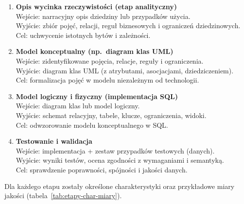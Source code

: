 \begin{enumerate}
  \item \textbf{Opis wycinka rzeczywistości (etap analityczny)} \\
  Wejście: narracyjny opis dziedziny lub przypadków użycia. \\
  Wyjście: zbiór pojęć, relacji, reguł biznesowych i ograniczeń dziedzinowych. \\
  Cel: uchwycenie istotnych bytów i zależności.
  \item \textbf{Model konceptualny (np.\ diagram klas UML)} \\
  Wejście: zidentyfikowane pojęcia, relacje, reguły i ograniczenia. \\
  Wyjście: diagram klas UML (z atrybutami, asocjacjami, dziedziczeniem). \\
  Cel: formalizacja pojęć w modelu niezależnym od technologii.
  \item \textbf{Model logiczny i fizyczny (implementacja SQL)} \\
  Wejście: diagram klas lub model logiczny. \\
  Wyjście: schemat relacyjny, tabele, klucze, ograniczenia, widoki. \\
  Cel: odwzorowanie modelu konceptualnego w SQL.
  \item \textbf{Testowanie i walidacja} \\
  Wejście: implementacja + zestaw przypadków testowych (danych). \\
  Wyjście: wyniki testów, ocena zgodności z wymaganiami i semantyką. \\
  Cel: sprawdzenie poprawności, spójności i jakości danych.
\end{enumerate}

Dla każdego etapu zostały określone charakterystyki oraz przykładowe miary jakości (tabela~\ref{tab:etapy-char-miary}).


